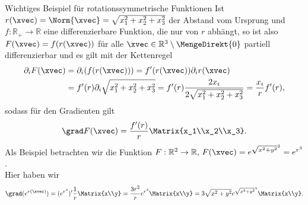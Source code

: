 \begin{Beispiel}
{Wichtiges Beispiel für rotationssymmetrische Funktionen}
Ist $r(\xvec)=\Norm{\xvec}=\sqrt{x_1^2+x_2^2+x_3^2}$ der Abstand vom Ursprung und $f:\mathbb{R}_+\to\mathbb{R} $ eine differenzierbare Funktion, die nur von $r$ abhängt, so ist also $F(\xvec)=f(r(\xvec))$ für alle $\xvec\in\mathbb{R}^3\setminus\MengeDirekt{0}$ partiell differenzierbar und es gilt mit der Kettenregel
\begin{align*}
    \partial_iF(\xvec)&=\partial_i(f(r(\xvec)))=f'(r(\xvec))\partial_ir(\xvec)\\
    &=f'(r)\partial_i\sqrt{x_1^2+x_2^2+x_3^2}=f'(r)\frac{2x_i}{2\sqrt{x_1^2+x_2^2+x_3^2}}=\frac{x_i}{r}f'(r),
\end{align*}
sodass für den Gradienten gilt
\begin{equation*}
    \grad F(\xvec)=\frac{f'(r)}{r}\Matrix{x_1\\x_2\\x_3}.
\end{equation*}
Als Beispiel betrachten wir die Funktion $F:\mathbb{R}^2\to\mathbb{R},\, F(\xvec)=e^{\sqrt{x^2+y^2}^3}=e^{r^3}$.\\
Hier haben wir
\begin{equation*}
    \grad (e^{r(\xvec)})=(e^{r^3})'\frac{1}{r}\Matrix{x\\y}=\frac{3r^2}{r}e^{r^3}\Matrix{x\\y}=3\sqrt{x^2+y^2}e^{\sqrt{x^2+y^2}^3}\Matrix{x\\y}.
\end{equation*}
\end{Beispiel}

